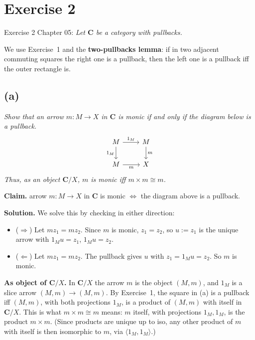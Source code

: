 \documentclass[11pt]{article}
\begin{document}
\section{Exercise 2}

Exercise 2 Chapter 05: \textit{
  Let $\mathbf{C}$ be a category with pullbacks.
}

We use Exercise~1 and the \textbf{two-pullbacks lemma}: if in two adjacent
commuting squares the right one is a pullback, then the left one is a pullback
iff the outer rectangle is.

\subsection*{(a)}

\textit{Show that an arrow $m : M \rightarrow X$ in $\mathbf{C}$ is monic if
and only if the diagram below is a pullback.}
\[
  \begin{tikzcd}
    M \ar[r, "1_{M}"] \ar[d, "1_{M}"'] & M \ar[d, "m"] \\
    M \ar[r, "m"'] & X
  \end{tikzcd}
\]
\textit{Thus, as an object $\mathbf{C}/X$, $m$ is monic iff $m \times m \cong m$.}

\medskip

\textbf{Claim.} arrow $m: M \to X$ in $\mathbf{C}$ is monic
$\Leftrightarrow$ the diagram above is a pullback.

\textbf{Solution.} We solve this by checking in either direction:

\begin{itemize}
  \item($\Rightarrow$) Let $m z_1 = m z_2$. Since $m$ is monic, $z_1 = z_2$, so
    $u := z_1$ is the unique arrow with $1_M u = z_1$, $1_M u = z_2$.
  \item ($\Leftarrow$) Let $m z_1 = m z_2$. The pullback gives $u$ with $z_1 =
    1_M u = z_2$. So $m$ is monic.
\end{itemize}

\medskip
\textbf{As object of $\mathbf{C}/X$.} In $\mathbf{C}/X$ the arrow $m$ is the
object $(M,m)$, and $1_M$ is a slice arrow $(M,m) \to (M,m)$. By Exercise~1,
the square in (a) is a pullback iff $(M,m)$, with both projections $1_M$, is a
product of $(M,m)$ with itself in $\mathbf{C}/X$. This is what $m \times m
\cong m$ means: $m$ itself, with projections $1_M, 1_M$, is the product $m
\times m$. (Since products are unique up to iso, any other product of $m$ with
itself is then isomorphic to $m$, via $\langle 1_M, 1_M \rangle$.)
\end{document}
